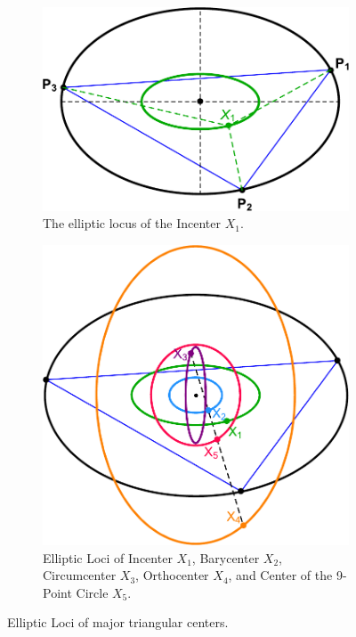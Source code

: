 \begin{figure}[H]
     \centering
     \begin{subfigure}[m]{0.45\textwidth}
     \centering
     \includegraphics[height=.65\linewidth]{pics/0020_incenter_locus.pdf}
         \caption{The elliptic locus of the Incenter $X_1$.}
        \label{fig:locus-incenter}
     \end{subfigure}
     \hfill
     \begin{subfigure}[m]{0.45\textwidth}
         \centering
         \includegraphics[height=\linewidth]{pics/0030_x12345_locus.pdf}
         \caption{Elliptic Loci of Incenter $X_1$, Barycenter $X_2$, Circumcenter $X_3$, Orthocenter $X_4$, and Center of the 9-Point Circle $X_5$.}
         \label{fig:locus-x12345}
     \end{subfigure}
     \caption{Elliptic Loci of major triangular centers.}
\end{figure}

